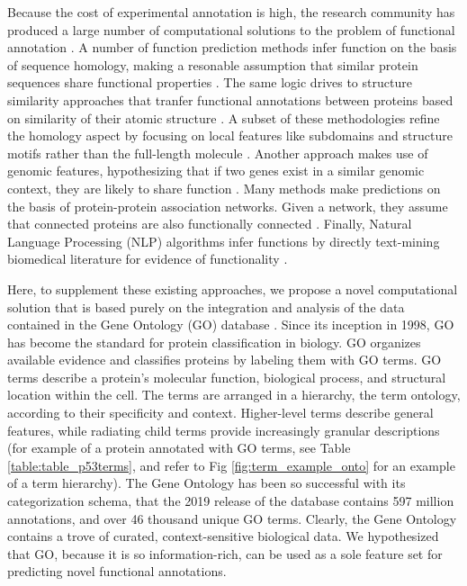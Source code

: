 \documentclass[12pt,a4paper]{report}
\begin{document}
Because the cost of experimental annotation is high, the research community has produced a large number of computational solutions to the problem of functional annotation \cite{cafa2}. A number of function prediction methods infer function on the basis of sequence homology, making a resonable assumption that similar protein sequences share functional properties \cite{BLAST, PSI_BLAST, pfam_full_seq}. The same logic drives to structure similarity approaches that tranfer functional annotations between proteins based on similarity of their atomic structure \cite{DALI_struct, SSAP_struct, COFACTOR_struct}. A subset of these methodologies refine the homology aspect by focusing on local features like subdomains and structure motifs rather than the full-length molecule \cite{CATH_structure_domain_sim, PROSITE_local_seq, venner_ETA}. Another approach makes use of genomic features, hypothesizing that if two genes exist in a similar genomic context, they are likely to share function \cite{synFPS_synteny}. Many methods make predictions on the basis of protein-protein association networks. Given a network, they assume that connected proteins are also functionally connected \cite{Deep_GOppi, Erdin2013, Martin_EXP1}. Finally, Natural Language Processing (NLP) algorithms infer functions by directly text-mining biomedical literature for evidence of functionality \cite{KDD1, NEK2}.

Here, to supplement these existing approaches, we propose a novel computational solution that is based purely on the integration and analysis of the data contained in the Gene Ontology (GO) database \cite{GOdb}. Since its inception in 1998, GO has become the standard for protein classification in biology. GO organizes available evidence and classifies proteins by labeling them with GO terms. GO terms describe a protein’s molecular function, biological process, and structural location within the cell. The terms are arranged in a hierarchy, the term ontology, according to their specificity and context. Higher-level terms describe general features, while radiating child terms provide increasingly granular descriptions (for example of a protein annotated with GO terms, see Table \ref{table:table_p53terms}, and refer to Fig \ref{fig:term_example_onto} for an example of a term hierarchy). The Gene Ontology has been so successful with its categorization schema, that the 2019 release of the database contains 597 million annotations, and over 46 thousand unique GO terms. Clearly, the Gene Ontology contains a trove of curated, context-sensitive biological data. We hypothesized that GO, because it is so information-rich, can be used as a sole feature set for predicting novel functional annotations.
\end{document}
